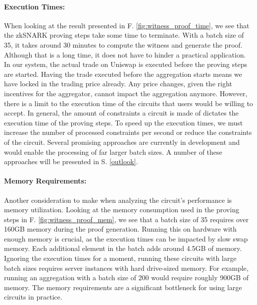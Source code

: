 \documentclass[../../thesis.tex]{subfiles}
\begin{document}
\paragraph{Execution Times:}
When looking at the result presented in F. \ref{fig:witness_proof_time}, we see that the zkSNARK proving steps take some time to terminate. With a batch size of 35, it takes around 30 minutes to compute the witness and generate the proof. Although that is a long time, it does not have to hinder a practical application. In our system, the actual trade on Uniswap is executed before the proving steps are started. Having the trade executed before the aggregation starts means we have locked in the trading price already. Any price changes, given the right incentives for the aggregator, cannot impact the aggregation anymore. However, there is a limit to the execution time of the circuits that users would be willing to accept. In general, the amount of constraints a circuit is made of dictates the execution time of the proving steps. To speed up the execution times, we must increase the number of processed constraints per second or reduce the constraints of the circuit. Several promising approaches are currently in development and would enable the processing of far larger batch sizes. A number of these approaches will be presented in S. \ref{outlook}.

\paragraph{Memory Requirements:}
Another consideration to make when analyzing the circuit's performance is memory utilization. Looking at the memory consumption used in the proving steps in F. \ref{fig:witness_proof_mem}, we see that a batch size of 35 requires over 160GB memory during the proof generation. Running this on hardware with enough memory is crucial, as the execution times can be impacted by slow swap memory. Each additional element in the batch adds around 4.5GB of memory. Ignoring the execution times for a moment, running these circuits with large batch sizes requires server instances with hard drive-sized memory. For example, running an aggregation with a batch size of 200 would require roughly 900GB of memory. The memory requirements are a significant bottleneck for using large circuits in practice.
\end{document}
